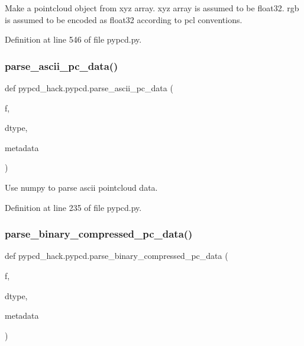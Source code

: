 \begin{DoxyVerb}Make a pointcloud object from xyz array.
xyz array is assumed to be float32.
rgb is assumed to be encoded as float32 according to pcl conventions.
\end{DoxyVerb}
 

Definition at line 546 of file pypcd.\+py.

\mbox{\label{namespacepypcd__hack_1_1pypcd_ab15f51bb43e0e29195936a5caf25bff7}} 
\subsubsection{\texorpdfstring{parse\+\_\+ascii\+\_\+pc\+\_\+data()}{parse\_ascii\_pc\_data()}}
{\footnotesize\ttfamily def pypcd\+\_\+hack.\+pypcd.\+parse\+\_\+ascii\+\_\+pc\+\_\+data (\begin{DoxyParamCaption}\item[{}]{f,  }\item[{}]{dtype,  }\item[{}]{metadata }\end{DoxyParamCaption})}

\begin{DoxyVerb}Use numpy to parse ascii pointcloud data.
\end{DoxyVerb}
 

Definition at line 235 of file pypcd.\+py.

\mbox{\label{namespacepypcd__hack_1_1pypcd_ae85e9dff84e32b410172653a14205f1e}} 
\subsubsection{\texorpdfstring{parse\+\_\+binary\+\_\+compressed\+\_\+pc\+\_\+data()}{parse\_binary\_compressed\_pc\_data()}}
{\footnotesize\ttfamily def pypcd\+\_\+hack.\+pypcd.\+parse\+\_\+binary\+\_\+compressed\+\_\+pc\+\_\+data (\begin{DoxyParamCaption}\item[{}]{f,  }\item[{}]{dtype,  }\item[{}]{metadata }\end{DoxyParamCaption})}

